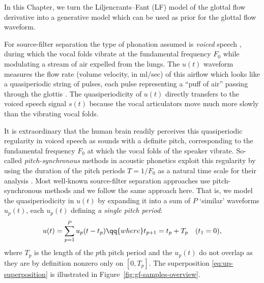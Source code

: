 \begin{chaptersections}{%
In this Chapter, we turn the Liljencrants–Fant (LF) model of the glottal flow derivative into a generative model which can be used as prior for the glottal flow waveform.
}

For source-filter separation the type of phonation assumed is \emph{voiced} speech \citep{Miller1959}, during which the vocal folds vibrate at the fundamental frequency $F_0$ while modulating a stream of air expelled from the lungs.
The $u(t)$ waveform measures the flow rate (volume velocity, in ml/sec) of this airflow which looks like a quasiperiodic string of pulses, each pulse representing a ``puff of air'' passing through the glottis \citep{Schroeder1999}.
The quasiperiodicity of $u(t)$ directly transfers to the voiced speech signal $s(t)$ because the vocal articulators move much more slowly than the vibrating vocal folds.

It is extraordinary that the human brain readily perceives this quasiperiodic regularity in voiced speech as sounds with a definite pitch, corresponding to the fundamental frequency $F_0$ at which the vocal folds of the speaker vibrate.
So-called \emph{pitch-synchronous} methods in acoustic phonetics exploit this regularity by using the duration of the pitch periods $T = 1/F_0$ as a natural time scale for their analysis \citep{Chen2019}.
Most well-known source-filter separation approaches use pitch-synchronous methods \citep[for example][]{Miller1959,Wong1979,Alku1992} and we follow the same approach here.
That is, we model the quasiperiodicity in $u(t)$ by expanding it into a sum of $P$ `similar' waveforms $u_p(t)$, each $u_p(t)$ defining \emph{a single pitch period}:
\begin{equation}
    u(t) = \sum_{p=1}^{P} u_p(t - t_p) \qq{where} t_{p+1} = t_p + T_p \quad (t_1 = 0),
\end{equation}
where $T_p$ is the length of the $p$th pitch period and the $u_p(t)$ do not overlap as they are by definition nonzero only on $[0,T_p]$.
The superposition \eqref{eq:up-superposition} is illustrated in Figure~\ref{fig:gf-samples-overview}.



\end{chaptersections}

